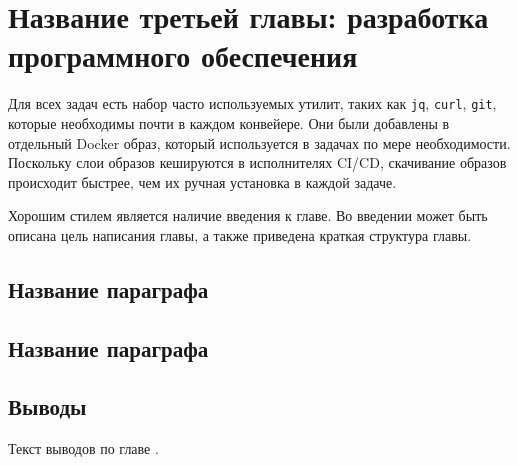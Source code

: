 \chapter{Название третьей главы: разработка программного обеспечения} \label{ch3}

Для всех задач есть набор часто используемых утилит, таких как \texttt{jq}, \texttt{curl}, \texttt{git}, которые необходимы почти в каждом конвейере.
Они были добавлены в отдельный Docker образ, который используется в задачах по мере необходимости.
Поскольку слои образов кешируются в исполнителях CI/CD, скачивание образов происходит быстрее, чем их ручная установка в каждой задаче.

Хорошим стилем является наличие введения к главе. Во введении может быть описана цель написания главы, а также приведена краткая структура главы.

\section{Название параграфа} \label{ch3:sec1}

\section{Название параграфа} \label{ch3:sec2}



\section{Выводы} \label{ch3:conclusion}

Текст выводов по главе \thechapter.


%
